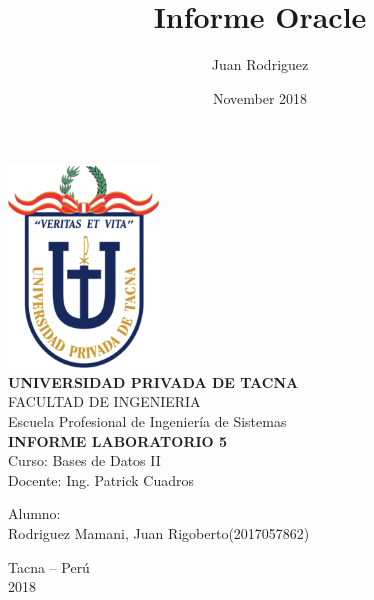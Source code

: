 \documentclass[12pt,letterpaper]{article}
\title{Informe Oracle}
\author{Juan Rodriguez}
\date{November 2018}
\begin{document}
    
    \begin{center}
        \includegraphics[width=4cm]{Imagenes/upt-logo.png}\\
        \vspace{12pt}
        \vspace{12pt}
        \large\textbf{UNIVERSIDAD PRIVADA DE TACNA}\\
        \vspace{12pt}
        \vspace{12pt}
        \large{FACULTAD DE INGENIERIA}\\
        \vspace{12pt}
        \vspace{12pt}
        \large{Escuela Profesional de Ingeniería de Sistemas}\\
        \vspace{12pt}
        \vspace{12pt}
        \textbf{INFORME LABORATORIO 5}\\
        \vspace{12pt}
        \vspace{12pt}
        Curso: Bases de Datos II\\
        \vspace{12pt}
        Docente: Ing. Patrick Cuadros\\
        \vspace*{12pt}
           \begin{flushleft}
        Alumno:\\
        \vspace{12pt}
        Rodriguez Mamani, Juan Rigoberto\hfill (2017057862)\\

        \end{flushleft}
        \vspace{100pt}

        Tacna – Perú\\
            2018
        \vspace{12pt}

            \thispagestyle{empty} %
            \setcounter{page}{0} %
    \end{center}
    \break
    
\end{document}
